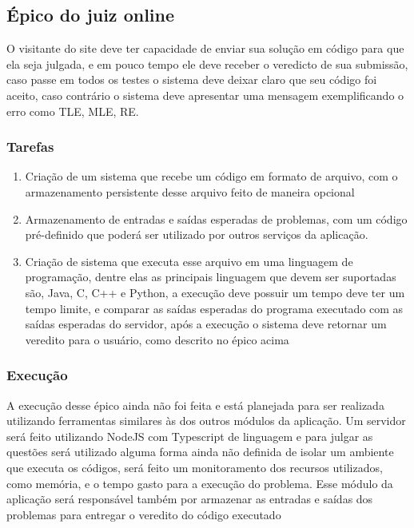 \subsection{Épico do juiz online}

O visitante do site deve ter capacidade de enviar sua solução em código para que ela seja julgada, e em pouco tempo ele deve receber o veredicto de sua submissão, caso passe em todos os testes o sistema deve deixar claro que seu código foi aceito, caso contrário o sistema deve apresentar uma mensagem exemplificando o erro como TLE, MLE, RE.

\subsubsection{Tarefas}
\begin{enumerate}
    \item Criação de um sistema que recebe um código em formato de arquivo, com o armazenamento persistente desse arquivo feito de maneira opcional
    \item Armazenamento de entradas e saídas esperadas de problemas, com um código pré-definido que poderá ser utilizado por outros serviços da aplicação.
    \item Criação de sistema que executa esse arquivo em uma linguagem de programação, dentre elas as principais linguagem que devem ser suportadas são, Java, C, C++ e Python, a execução deve possuir um tempo deve ter um tempo limite, e comparar as saídas esperadas do programa executado com as saídas esperadas do servidor, após a execução o sistema deve retornar um veredito para o usuário, como descrito no épico acima
\end{enumerate}

\subsubsection{Execução}

A execução desse épico ainda não foi feita e está planejada para ser realizada utilizando ferramentas similares às dos outros módulos da aplicação. Um servidor será feito utilizando NodeJS com Typescript de linguagem e para julgar as questões será utilizado alguma forma ainda não definida de isolar um ambiente que executa os códigos, será feito um monitoramento dos recursos utilizados, como memória, e o tempo gasto para a execução do problema. Esse módulo da aplicação será responsável também por armazenar as entradas e saídas dos problemas para entregar o veredito do código executado

